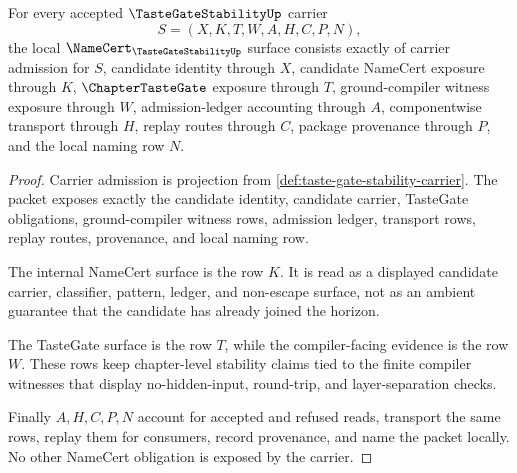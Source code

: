 \begin{theorem}
\label{thm:taste-gate-stability-namecert-obligations}
For every accepted $\TasteGateStabilityUp$ carrier
$$
S=(X,K,T,W,A,H,C,P,N),
$$
the local $\NameCert_{\TasteGateStabilityUp}$ surface consists exactly of carrier admission for $S$, candidate identity through $X$, candidate NameCert exposure through $K$, $\ChapterTasteGate$ exposure through $T$, ground-compiler witness exposure through $W$, admission-ledger accounting through $A$, componentwise transport through $H$, replay routes through $C$, package provenance through $P$, and the local naming row $N$.
\end{theorem}
\begin{proof}
Carrier admission is projection from \autoref{def:taste-gate-stability-carrier}. The packet exposes exactly the candidate identity, candidate carrier, TasteGate obligations, ground-compiler witness rows, admission ledger, transport rows, replay routes, provenance, and local naming row.

The internal NameCert surface is the row $K$. It is read as a displayed candidate carrier, classifier, pattern, ledger, and non-escape surface, not as an ambient guarantee that the candidate has already joined the horizon.

The TasteGate surface is the row $T$, while the compiler-facing evidence is the row $W$. These rows keep chapter-level stability claims tied to the finite compiler witnesses that display no-hidden-input, round-trip, and layer-separation checks.

Finally $A,H,C,P,N$ account for accepted and refused reads, transport the same rows, replay them for consumers, record provenance, and name the packet locally. No other NameCert obligation is exposed by the carrier.
\end{proof}

